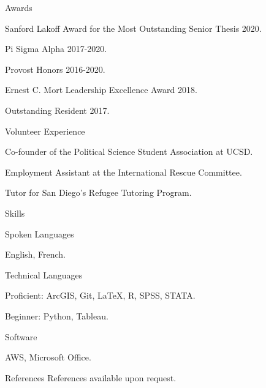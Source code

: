 \documentclass[10pt]{resume} %
\begin{document}
	
	\begin{rSection}{Awards}
		\itemsep -5pt
		\item Sanford Lakoff Award for the Most Outstanding Senior Thesis 2020.
		\item Pi Sigma Alpha 2017-2020. 
		\item Provost Honors 2016-2020. 
		\item Ernest C. Mort Leadership Excellence Award 2018. 
		\item Outstanding Resident 2017.
	\end{rSection}
	
	\begin{rSection}{Volunteer Experience} \itemsep -5pt
		\item Co-founder of the Political Science Student Association at UCSD.
		\item Employment Assistant at the International Rescue Committee.
		\item Tutor for San Diego's Refugee Tutoring Program.
	\end{rSection}

	\begin{rSection}{Skills} \itemsep -5pt
		\begin{rSubsection}{Spoken Languages}{}{}
			\item English, French.
		\end{rSubsection}
		\begin{rSubsection}{Technical Languages}{}{}
			\item Proficient: ArcGIS, Git, \LaTeX, R, SPSS, STATA.
			\item Beginner: Python, Tableau.
		\end{rSubsection}
		\begin{rSubsection}{Software}{}{}
			\item AWS, Microsoft Office.
		\end{rSubsection}
	\end{rSection}
	
	\begin{rSection}{References}
		References available upon request. 
	\end{rSection}
	
\end{document}

